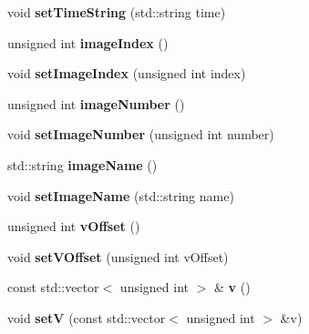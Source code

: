 \begin{DoxyCompactItemize}
\item 
void {\bfseries set\+Time\+String} (std\+::string time)\hypertarget{classLaserData_a235e9b0d21c126b899e894cfcbc58b56}{}\label{classLaserData_a235e9b0d21c126b899e894cfcbc58b56}

\item 
unsigned int {\bfseries image\+Index} ()\hypertarget{classLaserData_a4fe36e4d909288cac808443692e5dbb4}{}\label{classLaserData_a4fe36e4d909288cac808443692e5dbb4}

\item 
void {\bfseries set\+Image\+Index} (unsigned int index)\hypertarget{classLaserData_a3d1a25ff94c1b8a4ecdd276bcb921b95}{}\label{classLaserData_a3d1a25ff94c1b8a4ecdd276bcb921b95}

\item 
unsigned int {\bfseries image\+Number} ()\hypertarget{classLaserData_a4e568927dff7b1ff99e55fdd96d62b61}{}\label{classLaserData_a4e568927dff7b1ff99e55fdd96d62b61}

\item 
void {\bfseries set\+Image\+Number} (unsigned int number)\hypertarget{classLaserData_a4ac9f1c41ffbefb4f742c2e6cecc906a}{}\label{classLaserData_a4ac9f1c41ffbefb4f742c2e6cecc906a}

\item 
std\+::string {\bfseries image\+Name} ()\hypertarget{classLaserData_a0a77f60dce173954f2f2731986412cd8}{}\label{classLaserData_a0a77f60dce173954f2f2731986412cd8}

\item 
void {\bfseries set\+Image\+Name} (std\+::string name)\hypertarget{classLaserData_a14cc63f0ed77169b30be7450584de688}{}\label{classLaserData_a14cc63f0ed77169b30be7450584de688}

\item 
unsigned int {\bfseries v\+Offset} ()\hypertarget{classLaserData_a30303c527ff03c222727b957a2541bce}{}\label{classLaserData_a30303c527ff03c222727b957a2541bce}

\item 
void {\bfseries set\+V\+Offset} (unsigned int v\+Offset)\hypertarget{classLaserData_ad434a5e9a47ff000f99eb8d89ed3dd65}{}\label{classLaserData_ad434a5e9a47ff000f99eb8d89ed3dd65}

\item 
const std\+::vector$<$ unsigned int $>$ \& {\bfseries v} ()\hypertarget{classLaserData_a4bfc6b8a83236db7d1ba0627e5cb7168}{}\label{classLaserData_a4bfc6b8a83236db7d1ba0627e5cb7168}

\item 
void {\bfseries setV} (const std\+::vector$<$ unsigned int $>$ \&v)\hypertarget{classLaserData_a17dfb8ccb5849a7a3bf515622dc8b3b9}{}\label{classLaserData_a17dfb8ccb5849a7a3bf515622dc8b3b9}


\end{DoxyCompactItemize}
